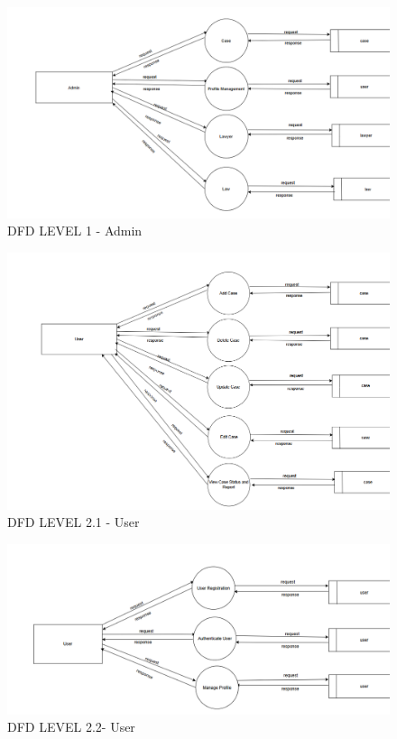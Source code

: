 \begin{figure}
  \centering
  \includegraphics[width=0.8\linewidth]{LawDFD1Admin.png}
 \caption{DFD LEVEL 1 - Admin}
   \label{fig:DFD LEVEL 1 - Admin}
\end{figure}

\begin{figure}
  \centering
  \includegraphics[width=0.8\linewidth]{User2.1case.png}
 \caption{DFD LEVEL 2.1 - User}
   \label{fig:DFD LEVEL 2.1 - User}
\end{figure}

\begin{figure}
  \centering
  \includegraphics[width=0.8\linewidth]{User2.2user.png}
 \caption{DFD LEVEL 2.2- User}
   \label{fig:DFD LEVEL 2.2 - User}
\end{figure}

